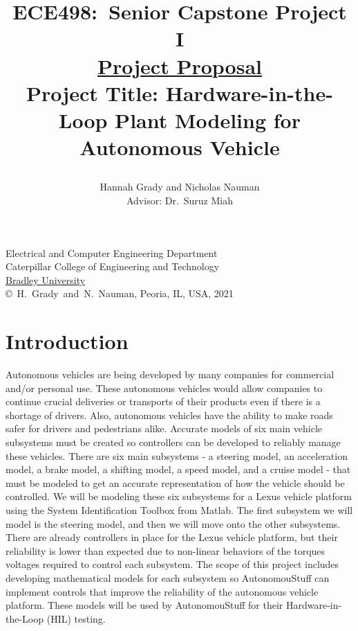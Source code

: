 \documentclass[letterpaper,12pt]{article}   %
\title{ECE498:~Senior Capstone Project I\\\textbf{\underline{Project Proposal}}\\
\vspace{0.5in}
Project Title: Hardware-in-the-Loop Plant Modeling for Autonomous Vehicle 
\vspace{1.0in}
\author{Hannah Grady and Nicholas Nauman\\ Advisor: Dr.~Suruz Miah}
}
\date{}  %
\begin{document}
\begin{titlepage}
 \maketitle

\vspace*{4.0cm}
\begin{center}
\normalsize
Electrical and Computer Engineering Department\\
Caterpillar College of Engineering and Technology\\
\href{http://www.bradley.edu/}{Bradley University}\\

\vspace*{6.0cm}
\copyright~H.~Grady~and~N.~Nauman, Peoria, IL, USA, 2021\\

\end{center}
\thispagestyle{empty}

\end{titlepage} 
\newpage
\renewcommand{\contentsname}{Table of Contents}
\tableofcontents
\newpage

\section{Introduction}
Autonomous vehicles are being developed by many companies for commercial and/or personal use. These autonomous vehicles would allow companies to continue crucial deliveries or transports of their products even if there is a shortage of drivers. Also, autonomous vehicles have the ability to make roads safer for drivers and pedestrians alike. Accurate models of six main vehicle subsystems must be created so controllers can be developed to reliably manage these vehicles.
\vspace*{12pt}
\noindent
There are six main subsystems - a steering model, an acceleration model, a brake model, a shifting model, a speed model, and a cruise model - that must be modeled to get an accurate representation of how the vehicle should be controlled. We will be modeling these six subsystems for a Lexus vehicle platform using the System Identification Toolbox from Matlab. The first subsystem we will model is the steering model, and then we will move onto the other subsystems. There are already controllers in place for the Lexus vehicle platform, but their reliability is lower than expected due to non-linear behaviors of the torques voltages required to control each subsystem. The scope of this project includes developing mathematical models for each subsystem so AutonomouStuff can implement controls that improve the reliability of the autonomous vehicle platform. These models will be used by AutonomouStuff for their Hardware-in-the-Loop (HIL) testing.
\end{document}
